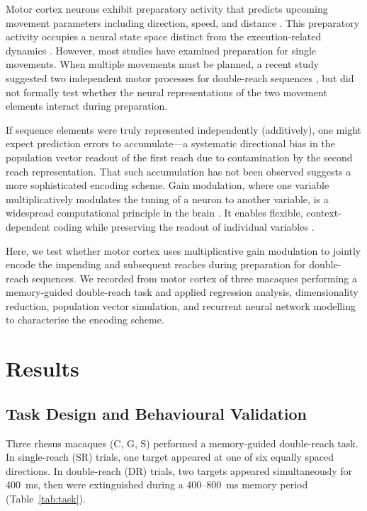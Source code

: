 \documentclass[11pt]{article}
\begin{document}
Motor cortex neurons exhibit preparatory activity that predicts upcoming movement parameters including direction, speed, and distance \citep{churchland2012neural, georgopoulos1986neuronal, shenoy2013cortical}. This preparatory activity occupies a neural state space distinct from the execution-related dynamics \citep{kaufman2014cortical}. However, most studies have examined preparation for single movements. When multiple movements must be planned, a recent study suggested two independent motor processes for double-reach sequences \citep{zimnik2021independent}, but did not formally test whether the neural representations of the two movement elements interact during preparation.

If sequence elements were truly represented independently (additively), one might expect prediction errors to accumulate---a systematic directional bias in the population vector readout of the first reach due to contamination by the second reach representation. That such accumulation has not been observed suggests a more sophisticated encoding scheme. Gain modulation, where one variable multiplicatively modulates the tuning of a neuron to another variable, is a widespread computational principle in the brain \citep{salinas2001gain, andersen1985encoding}. It enables flexible, context-dependent coding while preserving the readout of individual variables \citep{zipser1988back}.

Here, we test whether motor cortex uses multiplicative gain modulation to jointly encode the impending and subsequent reaches during preparation for double-reach sequences. We recorded from motor cortex of three macaques performing a memory-guided double-reach task and applied regression analysis, dimensionality reduction, population vector simulation, and recurrent neural network modelling to characterise the encoding scheme.

\section{Results}

\subsection{Task Design and Behavioural Validation}

Three rhesus macaques (C, G, S) performed a memory-guided double-reach task. In single-reach (SR) trials, one target appeared at one of six equally spaced directions. In double-reach (DR) trials, two targets appeared simultaneously for 400~ms, then were extinguished during a 400--800~ms memory period (Table~\ref{tab:task}).
\end{document}

